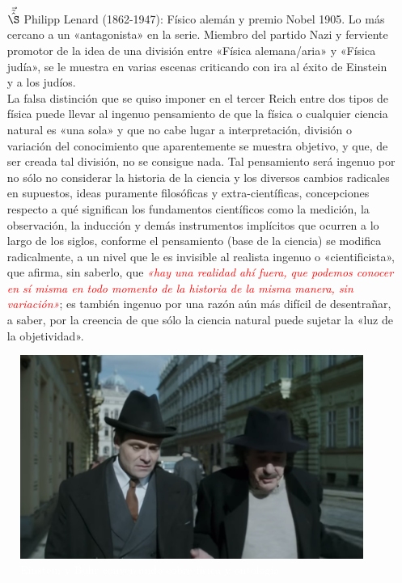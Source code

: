 \documentclass{article}
\begin{document}
\begin{itemize}
\item[$\vec{\tilde{\hat{\S}}}$] Philipp Lenard (1862-1947): Físico alemán y premio Nobel 1905. Lo más cercano a un «antagonista» en la serie. Miembro del partido Nazi y ferviente promotor de la idea de una división entre «Física alemana/aria» y «Física judía», se le muestra en varias escenas criticando con ira al éxito de Einstein y a los judíos. \\
La falsa distinción que se quiso imponer en el tercer Reich entre dos tipos de física puede llevar al ingenuo pensamiento de que la física o cualquier ciencia natural es «una sola» y que no cabe lugar a interpretación, división o variación del conocimiento que aparentemente se muestra objetivo, y que, de ser creada tal división, no se consigue nada. Tal pensamiento será ingenuo por no sólo no considerar la historia de la ciencia y los diversos cambios radicales en supuestos, ideas puramente filosóficas y extra-científicas, concepciones respecto a qué significan los fundamentos científicos como la medición, la observación, la inducción y demás instrumentos implícitos que ocurren a lo largo de los siglos, conforme el pensamiento (base de la ciencia) se modifica radicalmente, a un nivel que le es invisible al realista ingenuo o «cientificista», que afirma, sin saberlo, que \emph{\textcolor{Red}{«hay una realidad ahí fuera, que podemos conocer en sí misma en todo momento de la historia de la misma manera, sin variación»}}; es también ingenuo por una razón aún más difícil de desentrañar, a saber, por la creencia de que sólo la ciencia natural puede sujetar la «luz de la objetividad».

\end{itemize}

\vspace{10cm}


\begin{figure}[h]

\caption*{\hspace{3cm} \vspace{-0.3cm} \textcolor{White}{\tiny{Einstein y Bohr conversando sobre física y ontología}}}

\hspace{4cm} \includegraphics[scale=0.12, angle=-15]{Einstein_Bohr.jpeg}


\end{figure}
\end{document}
